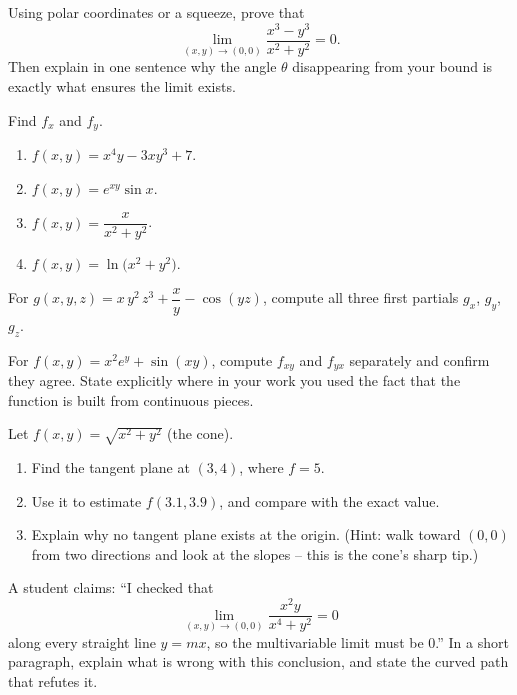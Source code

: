 \begin{exercise}
\label{ch32:exc-exists}
Using polar coordinates or a squeeze, prove that
\[
   \lim_{(x,y)\to(0,0)} \frac{x^3 - y^3}{x^2+y^2} = 0.
\]
Then explain in one sentence why the angle $\theta$ disappearing from your bound is exactly what ensures the limit exists.
\end{exercise}

\begin{exercise}
\label{ch32:exc-partials}
Find $f_x$ and $f_y$.
\begin{enumerate}[label=(\alph*)]
  \item $f(x,y)=x^4 y - 3xy^3 + 7$.
  \item $f(x,y)=e^{xy}\sin x$.
  \item $f(x,y)=\dfrac{x}{x^2+y^2}$.
  \item $f(x,y)=\ln\!\big(x^2 + y^2\big)$.
\end{enumerate}
\end{exercise}

\begin{exercise}
\label{ch32:exc-three}
For $g(x,y,z) = x\,y^2\,z^3 + \dfrac{x}{y} - \cos(yz)$, compute all three first partials
$g_x$, $g_y$, $g_z$.
\end{exercise}

\begin{exercise}
\label{ch32:exc-clairaut}
For $f(x,y)=x^2 e^{y} + \sin(xy)$, compute $f_{xy}$ and $f_{yx}$ separately and confirm they
agree. State explicitly where in your work you used the fact that the function is built from
continuous pieces.
\end{exercise}

\begin{exercise}
\label{ch32:exc-tangent}
Let $f(x,y)=\sqrt{x^2+y^2}$ (the cone).
\begin{enumerate}[label=(\alph*)]
  \item Find the tangent plane at $(3,4)$, where $f=5$.
  \item Use it to estimate $f(3.1, 3.9)$, and compare with the exact value.
  \item Explain why no tangent plane exists at the origin. (Hint: walk toward $(0,0)$ from two
  directions and look at the slopes -- this is the cone's sharp tip.)
\end{enumerate}
\end{exercise}

\begin{exercise}
\label{ch32:exc-concept}
A student claims: ``I checked that
\[
   \lim_{(x,y)\to(0,0)} \frac{x^2 y}{x^4+y^2} = 0
\]
along every straight line $y=mx$, so the multivariable limit must be $0$.''
In a short paragraph, explain what is wrong with this conclusion, and state the curved path that refutes it.
\end{exercise}

